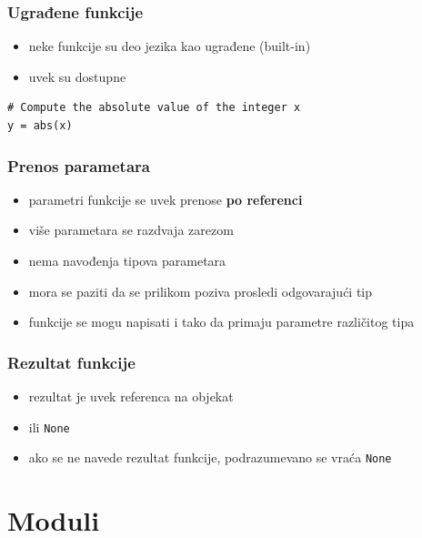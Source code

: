 \documentclass[compress]{beamer}
\begin{document}
\begin{frame}[fragile]
\frametitle{Ugrađene funkcije}
\begin{itemize}
  \item neke funkcije su deo jezika kao ugrađene (built-in)
  \item uvek su dostupne
\end{itemize}
\begin{verbatim}
# Compute the absolute value of the integer x
y = abs(x)
\end{verbatim}
\end{frame}
  
\begin{frame}[fragile]
\frametitle{Prenos parametara}
\begin{itemize}
  \item parametri funkcije se uvek prenose \textbf{po referenci}
  \item više parametara se razdvaja zarezom
  \item nema navođenja tipova parametara
\end{itemize}
\begin{itemize}
  \item mora se paziti da se prilikom poziva prosledi odgovarajući tip
  \item funkcije se mogu napisati i tako da primaju parametre različitog tipa
\end{itemize}
\end{frame}
  
\begin{frame}[fragile]
\frametitle{Rezultat funkcije}
\begin{itemize}
  \item rezultat je uvek referenca na objekat
  \item ili \texttt{None}
  \item ako se ne navede rezultat funkcije, podrazumevano se vraća \texttt{None}
\end{itemize}
\end{frame}

\section{Moduli}
\end{document}

